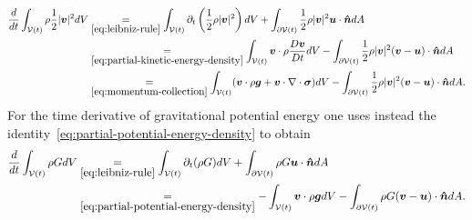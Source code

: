 \begin{align}
    \frac{d}{dt}\int_{\mathcal{V}(t)}\rho\frac{1}{2}|\bm{v}|^2dV&\underset{\eqref{eq:leibniz-rule}}{=}\int_{\mathcal{V}(t)}\partial_t\left(\frac{1}{2}\rho|\bm{v}|^2\right)dV+\int_{\partial\mathcal{V}(t)}\frac{1}{2}\rho|\bm{v}|^2\bm{u}\cdot\bm{\hat{n}}dA\nonumber\\
    &\underset{\eqref{eq:partial-kinetic-energy-density}}{=}\int_{\mathcal{V}(t)}\bm{v}\cdot\rho\frac{D\bm{v}}{Dt}dV-\int_{\partial\mathcal{V}(t)}\frac{1}{2}\rho|\bm{v}|^2(\bm{v}-\bm{u})\cdot\bm{\hat{n}}dA\nonumber\\
    &\underset{\eqref{eq:momentum-collection}}{=}\int_{\mathcal{V}(t)}(\bm{v}\cdot\rho\bm{g}+\bm{v}\cdot\nabla\cdot\bm{\sigma})dV-\int_{\partial\mathcal{V}(t)}\frac{1}{2}\rho|\bm{v}|^2(\bm{v}-\bm{u})\cdot\bm{\hat{n}}dA.
\end{align}
For the time derivative of gravitational potential energy one uses instead the identity~\eqref{eq:partial-potential-energy-density} to obtain
\begin{align}
    \frac{d}{dt}\int_{\mathcal{V}(t)}\rho GdV&\underset{\eqref{eq:leibniz-rule}}{=}\int_{\mathcal{V}(t)}\partial_t(\rho G)dV+\int_{\partial\mathcal{V}(t)}\rho G\bm{u}\cdot\bm{\hat{n}}dA\nonumber\\
    &\underset{\eqref{eq:partial-potential-energy-density}}{=}-\int_{\mathcal{V}(t)}\bm{v}\cdot\rho\bm{g}dV-\int_{\partial\mathcal{V}(t)}\rho G(\bm{v}-\bm{u})\cdot\bm{\hat{n}}dA.
\end{align}


